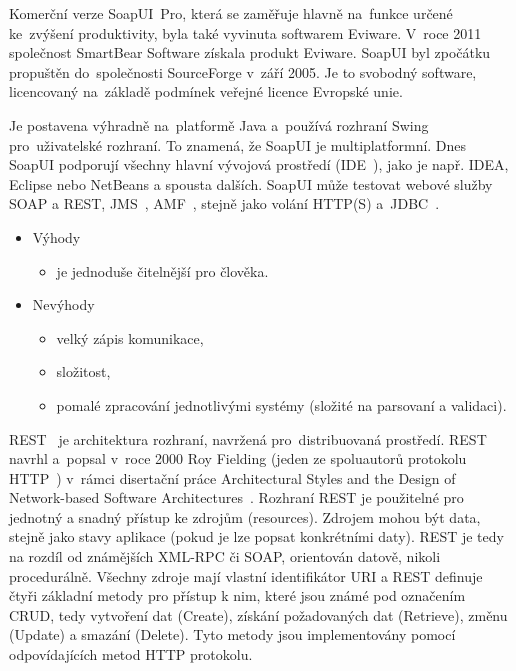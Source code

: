 Komerční verze SoapUI~Pro, která se zaměřuje hlavně na~funkce určené ke~zvýšení produktivity, byla také vyvinuta softwarem Eviware. V~roce 2011 společnost SmartBear Software získala produkt Eviware. SoapUI byl zpočátku propuštěn do~společnosti SourceForge v~září 2005. Je to svobodný software, licencovaný na~základě podmínek veřejné licence Evropské unie. 

Je postavena výhradně na~platformě Java a~používá rozhraní Swing pro~uživatelské rozhraní. To znamená, že SoapUI je multiplatformní. Dnes SoapUI podporují všechny hlavní vývojová prostředí (IDE~\cite{ide}), jako je např. IDEA, Eclipse nebo NetBeans a spousta dalších. SoapUI může testovat webové služby SOAP a REST, JMS~\cite{jms}, AMF~\cite{amf}, stejně jako volání HTTP(S) a~JDBC~\cite{jdbc}.

\begin{itemize}
	\setlength{\parskip}{0pt}
	\setlength{\itemsep}{0pt}
	\item {Výhody}
	\begin{itemize}
		\setlength{\parskip}{0pt}
		\setlength{\itemsep}{0pt}
		\item {je jednoduše čitelnější pro člověka.}
	\end{itemize}	
	
	\item {Nevýhody}
	\begin{itemize}
		\setlength{\parskip}{0pt}
		\setlength{\itemsep}{0pt}
		\item {velký zápis komunikace,}
		\item {složitost,}
		\item {pomalé zpracování jednotlivými systémy (složité na parsovaní a validaci).}
	\end{itemize}
\end{itemize}

REST~\cite{rest} je architektura rozhraní, navržená pro~distribuovaná prostředí. REST navrhl a~popsal v~roce 2000 Roy Fielding (jeden ze spoluautorů protokolu HTTP~\cite{http}) v~rámci disertační práce Architectural Styles and the Design of Network-based Software Architectures~\cite{rest-publication}. Rozhraní REST je použitelné pro jednotný a snadný přístup ke zdrojům (resources). Zdrojem mohou být data, stejně jako stavy aplikace (pokud je lze popsat konkrétními daty). REST je tedy na rozdíl od známějších XML-RPC či SOAP, orientován datově, nikoli procedurálně. Všechny zdroje mají vlastní identifikátor URI a REST definuje čtyři základní metody pro přístup k nim, které jsou známé pod označením CRUD, tedy vytvoření dat (Create), získání požadovaných dat (Retrieve), změnu (Update) a smazání (Delete). Tyto metody jsou implementovány pomocí
odpovídajících metod HTTP protokolu.

